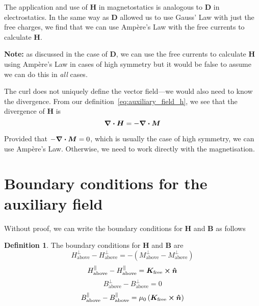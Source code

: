 \documentclass[12pt,chapterprefix=false,dvipsnames]{scrbook}
\theoremstyle{dotless}
\theoremstyle{definition}
\newtheorem{protodefinition}{Definition}[section]
\newenvironment{definition}
{\colorlet{shadecolor}{black!15}\begin{shaded}\begin{protodefinition}}
			{\end{protodefinition}\end{shaded}}
\begin{document}
The application and use of $\bm{H}$ in
magnetostatics is analogous to $\bm{D}$ in
electrostatics. In the same way as $\bm{D}$
allowed us to use Gauss' Law with just the free charges, we find
that we can use Ampère's Law with the free currents to calculate
$\bm{H}$.

\textbf{Note:} as discussed in the case of
$\bm{D}$, we can use the free currents to
calculate $\bm{H}$ using Ampère's Law in cases of
high symmetry but it would be false to assume we can do this in
\textit{all} cases.

The curl does not uniquely define the vector field---we would
also need to know the divergence. From our
definition~\ref{eq:auxiliary_field_h}, we see that the divergence
of $\bm{H}$ is
\begin{equation}
	\label{eq:auxiliary_field_divergence}
	\divergence{\bm{H}}
	=
	-\divergence{\bm{M}}
\end{equation}

Provided that $-\divergence{\bm{M}} = 0$, which is usually the case
of high symmetry, we can use Ampère's Law. Otherwise, we need to
work directly with the magnetisation.

\section{Boundary conditions for the auxiliary field}%
\label{sec:boundary_conditions_for_the_auxiliary_field}

Without proof, we can write the boundary conditions for
$\bm{H}$ and $\bm{B}$ as follows

\begin{definition}
	The boundary conditions for $\bm{H}$ and
	$\bm{B}$ are
	\begin{equation}
		H^\perp_{\mathrm{above}} - H^\perp_{\mathrm{above}} =
		-\left(M^\perp_{\mathrm{above}} - M^\perp_{\mathrm{above}}\right)
	\end{equation}
	\begin{equation}
		H^\parallel_{\mathrm{above}} - H^\parallel_{\mathrm{above}} =
		\bm{K}_{\mathrm{free}}\cross\bm{\hat{n}}
	\end{equation}
	\begin{equation}
		B^\perp_{\mathrm{above}} - B^\perp_{\mathrm{above}} = 0
	\end{equation}
	\begin{equation}
		B^\parallel_{\mathrm{above}} - B^\parallel_{\mathrm{above}} =
		\mu_{0}\left(\bm{K}_{\mathrm{free}}\cross\bm{\hat{n}}\right)
	\end{equation}
\end{definition}
\end{document}
